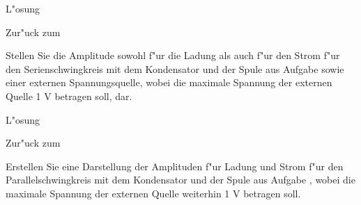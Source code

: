 \begin{MExercises}
\begin{MExercise}
\begin{MHint}{L"osung}
\end{MHint}

Zur"uck zum 
\end{MExercise}

\begin{MExercise}
Stellen Sie die Amplitude sowohl f"ur die Ladung als auch f"ur den Strom f"ur den Serienschwingkreis mit dem Kondensator und der Spule aus Aufgabe  sowie einer externen Spannungsquelle, wobei die maximale Spannung der externen Quelle 1 V betragen soll, dar.

\begin{MHint}{L"osung}
\begin{center}
\end{center}
\begin{center}
\end{center}

\end{MHint}

Zur"uck zum 
\end{MExercise}

\begin{MExercise}
Erstellen Sie eine Darstellung der Amplituden f"ur Ladung und Strom f"ur den Parallelschwingkreis mit dem Kondensator und der Spule aus Aufgabe , wobei die maximale Spannung der externen Quelle weiterhin 1 V betragen soll.


\end{MExercise}
\end{MExercises}
